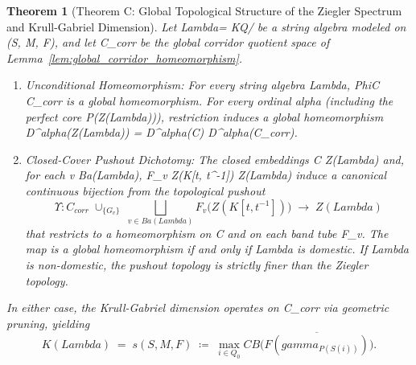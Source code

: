 \documentclass[11pt,a4paper,reqno]{amsart}
\def\({}%
\def\){}%
\def\mathcal#1{#1}%
\def\mathbb#1{#1}%
\def\mathrm#1{#1}%
\def\operatorname#1{#1}%
\def\K{K}%
\def\forb{F}%
\def\Zg{Z}%
\def\KG{K}%
\def\CB{CB}%
\def\stgeo{s}%
\def\Dgeo{D}%
\def\hookrightarrow{\to}%
\def\longrightarrow{\to}%
\def\gamma{gamma}%
\def\alpha{alpha}%
\def\Phi{Phi}%
\def\Lambda{Lambda}%
\def\textbf#1{#1}%
\newtheorem{theorem}{Theorem}[section]
\theoremstyle{definition}
\theoremstyle{remark}
\newcommand{\K}{\mathbb{K}}
\newcommand{\Zg}{\operatorname{Zg}}
\newcommand{\CB}{\operatorname{CB}}
\newcommand{\KG}{\operatorname{KG}}
\newcommand{\forb}{\mathfrak{F}}
\newcommand{\Dgeo}{D_{\mathrm{geo}}}
\newcommand{\stgeo}{\operatorname{st}_{\mathrm{geo}}}
\begin{document}
\begin{theorem}[Theorem C: Global Topological Structure of the Ziegler Spectrum and Krull-Gabriel Dimension]
\label{thm:classification}
Let \(\Lambda = \K\mathcal{Q}/\langle\rho\rangle\) be a string algebra modeled on \((\mathcal{S}, \mathcal{M}, \forb)\), and let \(\mathcal{C}_{\mathrm{corr}}\) be the global corridor quotient space of Lemma~\ref{lem:global_corridor_homeomorphism}. 
\begin{enumerate}
    \item \textbf{Unconditional Homeomorphism:} For every string algebra \(\Lambda\), \(\Phi \colon C \xrightarrow{\sim} \mathcal{C}_{\mathrm{corr}}\) is a global homeomorphism. For every ordinal \(\alpha {}\) (including the perfect core \(\mathcal{P}(\Zg(\Lambda))\)), restriction induces a global homeomorphism \(D^\alpha(\Zg(\Lambda)) = D^\alpha(C) \xrightarrow{\sim} \Dgeo^\alpha(\mathcal{C}_{\mathrm{corr}})\).
    \item \textbf{Closed-Cover Pushout Dichotomy:} The closed embeddings \(C \hookrightarrow \Zg(\Lambda)\) and, for each \(v \in \operatorname{Ba}(\Lambda)\), \(F_v \colon \Zg(\K[t, t^{-1}]) \hookrightarrow \Zg(\Lambda)\) induce a canonical continuous bijection from the topological pushout
    \[
    \Upsilon \colon \mathcal{C}_{\mathrm{corr}} \;\cup_{\{G_v\}}\; \bigsqcup_{v \in \operatorname{Ba}(\Lambda)} F_v\bigl(\Zg(\K[t, t^{-1}])\bigr) \;\longrightarrow\; \Zg(\Lambda)
    \]
    that restricts to a homeomorphism on \(C\) and on each band tube \(F_v\). The map \(\Upsilon\) is a global homeomorphism if and only if \(\Lambda\) is domestic. If \(\Lambda\) is non-domestic, the pushout topology is strictly finer than the Ziegler topology.
\end{enumerate}
In either case, the Krull-Gabriel dimension operates on \(\mathcal{C}_{\mathrm{corr}}\) via geometric pruning, yielding
\[
\KG(\Lambda) \;=\; \stgeo(\mathcal{S}, \mathcal{M}, \forb) \;\coloneqq\; \max_{i \in Q_0} \CB\big(\overline{\mathcal{F}(\gamma_{P(S(i))})}\big).
\]
\end{theorem}
\end{document}
